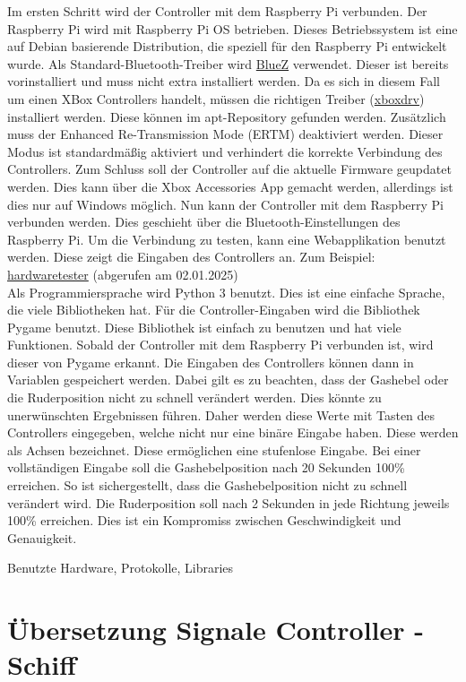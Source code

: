Im ersten Schritt wird der Controller mit dem Raspberry Pi verbunden. Der Raspberry Pi wird mit Raspberry Pi OS betrieben. 
Dieses Betriebssystem ist eine auf Debian basierende Distribution, die speziell für den Raspberry Pi entwickelt wurde.
Als Standard-Bluetooth-Treiber wird \href{https://www.bluez.org/}{BlueZ} verwendet. Dieser ist bereits vorinstalliert und muss 
nicht extra installiert werden. Da es sich in diesem Fall um einen XBox Controllers handelt, müssen die richtigen Treiber
(\href{https://github.com/xboxdrv/xboxdrv}{xboxdrv}) installiert werden. Diese können im apt-Repository gefunden werden.
Zusätzlich muss der Enhanced Re-Transmission Mode (ERTM) deaktiviert werden. Dieser Modus ist standardmäßig aktiviert und
verhindert die korrekte Verbindung des Controllers. Zum Schluss soll der Controller auf die aktuelle Firmware geupdatet werden.
Dies kann über die Xbox Accessories App gemacht werden, allerdings ist dies nur auf Windows möglich. Nun kann 
der Controller mit dem Raspberry Pi verbunden werden. Dies geschieht über die Bluetooth-Einstellungen des Raspberry Pi.
Um die Verbindung zu testen, kann eine Webapplikation benutzt werden. Diese zeigt die Eingaben des Controllers an. Zum 
Beispiel: \href{https://hardwaretester.com/gamepad}{hardwaretester} (abgerufen am 02.01.2025) 
\\
Als Programmiersprache wird Python 3 benutzt. Dies ist eine einfache Sprache, die viele Bibliotheken hat. Für die
Controller-Eingaben wird die Bibliothek Pygame benutzt. Diese Bibliothek ist einfach zu benutzen und hat viele Funktionen.
Sobald der Controller mit dem Raspberry Pi verbunden ist, wird dieser von Pygame erkannt. Die Eingaben des Controllers
können dann in Variablen gespeichert werden. Dabei gilt es zu beachten, dass der Gashebel oder die Ruderposition nicht
zu schnell verändert werden. Dies könnte zu unerwünschten Ergebnissen führen. Daher werden diese Werte mit Tasten des
Controllers eingegeben, welche nicht nur eine binäre Eingabe haben. Diese werden als Achsen bezeichnet. Diese ermöglichen
eine stufenlose Eingabe. Bei einer vollständigen Eingabe soll die Gashebelposition nach 20 Sekunden 100\% erreichen.
So ist sichergestellt, dass die Gashebelposition nicht zu schnell verändert wird. Die Ruderposition soll nach 2 Sekunden
in jede Richtung jeweils 100\% erreichen. Dies ist ein Kompromiss zwischen Geschwindigkeit und Genauigkeit.


Benutzte Hardware, Protokolle, Libraries 

\section{Übersetzung Signale Controller - Schiff}

